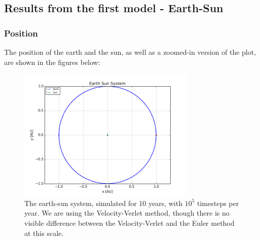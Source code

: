\documentclass[a4paper, 10pt]{article}
\begin{document}
\subsection{Results from the first model - Earth-Sun}
\subsubsection{Position}
The position of the earth and the sun, as well as a zoomed-in version of the plot, are shown in the figures below:
\begin{figure}[!ht]
    \centering
    \includegraphics[height=2.5in]{earthsun.png}
    \caption{The earth-sun system, simulated for 10 years, with $10^5$ timesteps per year. We are using the Velocity-Verlet method, though there is no visible difference between the Velocity-Verlet and the Euler method at this scale.} \label{fig:earth-sun-figure1}
\end{figure}
\end{document}
